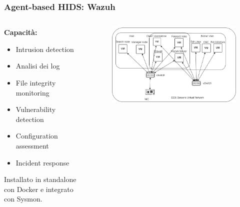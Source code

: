\begin{frame}
    \frametitle{Agent-based HIDS: Wazuh}


    \begin{columns}[t]
        \begin{column}{0.5\textwidth}
            \textbf{Capacità:}
            \begin{itemize}
                \item Intrusion detection
                \item Analisi dei log
                \item File integrity monitoring
                \item Vulnerability detection
                \item Configuration assessment
                \item Incident response
            \end{itemize}
            \bigskip
            Installato in standalone con Docker e integrato con Sysmon.

        \end{column}
        \begin{column}{0.5\textwidth}
            \begin{figure}[hbtp]
                \centering
                \includegraphics[width=\textwidth]{res/fig/infrastruttura3.png}
            \end{figure}
        \end{column}
    \end{columns}
\end{frame}



